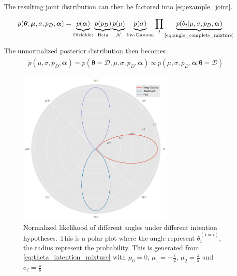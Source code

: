 The resulting joint distribution  can then be factored into \cref{eq:example_joint}.

\begin{align}\label{eq:example_joint}
\begin{split}
    p(\boldsymbol{\theta}, \boldsymbol{\mu}, \sigma, p_D, \boldsymbol{\alpha}) =\underbrace{p(\boldsymbol{\alpha})}_{\text{Dirichlet}}\underbrace{p(p_D)}_{\text{Beta}}\underbrace{p(\mu)}_{\mathcal{N}} \underbrace{p(\sigma)}_{\text{Inv-Gamma}} \prod_t \underbrace{p(\theta_t | \mu, \sigma, p_D, \boldsymbol{\alpha})}_{\text{\cref{eq:angle_complete_mixture}}}
\end{split}
\end{align}

The unnormalized posterior distribution then becomes
\begin{align}\label{eq:example_unnormalized_posterior}
\begin{split}
    \tilde{p}(\mu, \sigma, p_D, \boldsymbol{\alpha}) =  p(\boldsymbol{\theta} = \mathcal{D}, \mu, \sigma, p_D, \boldsymbol{\alpha}) \propto p(\mu, \sigma, p_D, \boldsymbol{\alpha} | \boldsymbol{\theta}= \mathcal{D})
\end{split}
\end{align}


\begin{figure}
    \centering
    \includegraphics[width=0.7\textwidth]{figures/intention_angle.png}
    \caption{Normalized likelihood of different angles under different intention hypotheses. This is a polar plot where the angle represent $\theta_t^{(I=i)}$, the radius represent the probability. This is generated from \cref{eq:theta_intention_mixture} with $\mu_0=0$, $\mu_1 = -\frac{\pi}{2}$, $\mu_2=\frac{\pi}{2}$ and $\sigma_i=\frac{\pi}{8}$}
    \label{fig:intention_angle}
\end{figure}

